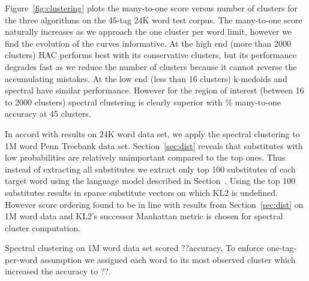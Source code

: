 Figure~\ref{fig:clustering} plots the many-to-one score versus number
of clusters for the three algorithms on the 45-tag 24K word test
corpus.  The many-to-one score naturally increases as we approach the
one cluster per word limit, however we find the evolution of the
curves informative.  At the high end (more than 2000 clusters) HAC
performs best with its conservative clusters, but its performance
degrades fast as we reduce the number of clusters because it cannot
reverse the accumulating mistakes.  At the low end (less than 16
clusters) k-medoids and spectral have similar performance.  However
for the region of interest (between 16 to 2000 clusters) spectral
clustering is clearly superior with \spectralResult\% many-to-one
accuracy at 45 clusters.

In accord with results on 24K word data set, we apply the spectral
clustering to 1M word Penn Treebank data set.  Section~\ref{sec:dist}
reveals that substitutes with low probabilities are relatively
unimportant compared to the top ones.  Thus instead of extracting all
substitutes we extract only top 100 substitutes of each target word
using the language model described in Section~\cite{sec:lm}.  Using
the top 100 substitutes results in sparse substitute vectors on which
KL2 is undefined.  However score ordering found to be in line with
results from Section~\ref{sec:dist} on 1M word data and KL2's
successor Manhattan metric is chosen for spectral cluster computation.

Spectral clustering on 1M word data set scored ??\mto accuracy.  To
enforce one-tag-per-word assumption we assigned each word to its most
observed cluster which increased the \mto accuracy to ??.

